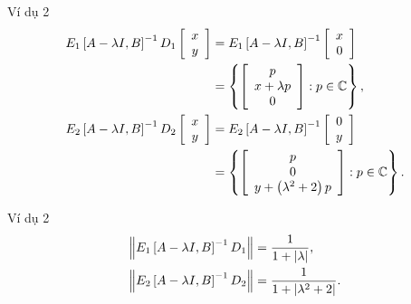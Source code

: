 \begin{frame}{Ví dụ 2}
    \begin{align}
        E_{1}\left[A-\lambda I,B\right]^{-1}D_{1}\left[\begin{array}{c}
        x\\
        y
        \end{array}\right] & =E_{1}\left[A-\lambda I,B\right]^{-1}\left[\begin{array}{c}
        x\\
        0
        \end{array}\right] \nonumber\\
         & =\left\{ \left[\begin{array}{c}
        p\\
        x+\lambda p\\
        0
        \end{array}\right]:p\in\mathbb{C}\right\} ,\\
        E_{2}\left[A-\lambda I,B\right]^{-1}D_{2}\left[\begin{array}{c}
        x\\
        y
        \end{array}\right] & =E_{2}\left[A-\lambda I,B\right]^{-1}\left[\begin{array}{c}
        0\\
        y
        \end{array}\right] \nonumber\\
         & =\left\{ \left[\begin{array}{c}
        p\\
        0\\
        y+\left(\lambda^{2}+2\right)p
        \end{array}\right]:p\in\mathbb{C}\right\} .
    \end{align}
\end{frame}

\begin{frame}{Ví dụ 2}
    \begin{align}
    \left\lVert E_{1}\left[A-\lambda I,B\right]^{-1}D_{1}\right\rVert & =\frac{1}{1+\left|\lambda\right|},\\
    \left\lVert E_{2}\left[A-\lambda I,B\right]^{-1}D_{2}\right\rVert & =\frac{1}{1+\left|\lambda^{2}+2\right|}.
    \end{align}
\end{frame}


